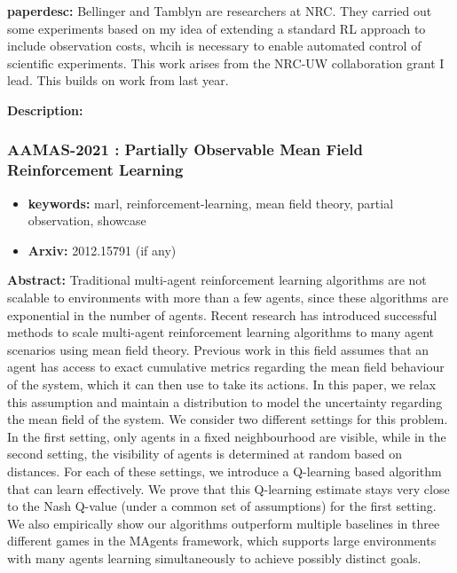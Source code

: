 \documentclass{article}
\begin{document}
\textbf{paperdesc:} Bellinger and Tamblyn are researchers at NRC. They carried out some experiments based on my idea of extending a standard RL approach to include observation costs, whcih is necessary to enable automated control of scientific experiments. This work arises from the NRC-UW collaboration grant I lead. This builds on work from \cite{bellinger2020reinforcement} last year.

\textbf{Description:} 



\newpage
\subsubsection{\textbf{AAMAS-2021} : Partially Observable Mean Field Reinforcement Learning}
\begin{itemize}
\item \textbf{keywords:} marl, reinforcement-learning, mean field theory, partial observation, showcase
\item \textbf{Arxiv:} 2012.15791 (if any)
\end{itemize}


\textbf{Abstract:} Traditional multi-agent reinforcement learning algorithms are not scalable to environments with more than a few agents, since these algorithms are exponential in the number of agents. Recent research has introduced successful methods to scale multi-agent reinforcement learning algorithms to many agent scenarios using mean field theory. Previous work in this field assumes that an agent has access to exact cumulative metrics regarding the mean field behaviour of the system, which it can then use to take its actions. In this paper, we relax this assumption and maintain a distribution to model the uncertainty regarding the mean field of the system. We consider two different settings for this problem. In the first setting, only agents in a fixed neighbourhood are visible, while in the second setting, the visibility of agents is determined at random based on distances. For each of these settings, we introduce a Q-learning based algorithm that can learn effectively. We prove that this Q-learning estimate stays very close to the Nash Q-value (under a common set of assumptions) for the first setting. We also empirically show our algorithms outperform multiple baselines in three different games in the MAgents framework, which supports large environments with many agents learning simultaneously to achieve possibly distinct goals.
\end{document}
